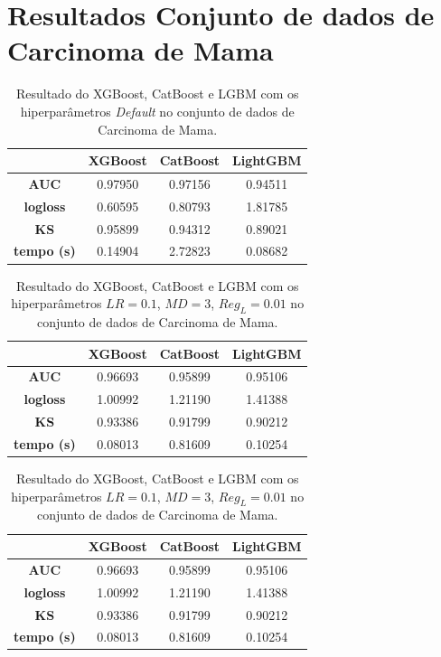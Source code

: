 \section{Resultados Conjunto de dados de Carcinoma de Mama}
\begin{table}[H]
\centering
\begin{tabular}{|c|c|c|c|}
\hline
	& \textbf{XGBoost} &\textbf{CatBoost} & \textbf{LightGBM} \\
\hline
\textbf{AUC}	& 0.97950	&0.97156	&0.94511 \\
\hline
\textbf{logloss}	&0.60595	&0.80793&	1.81785 \\
\hline
\textbf{KS}	&0.95899	&0.94312	&0.89021 \\
\hline
\textbf{tempo (s)}	&0.14904	&2.72823	&0.08682 \\
\hline
\end{tabular}
\caption{Resultado do XGBoost, CatBoost e LGBM com os hiperparâmetros \textit{Default} no conjunto de dados de Carcinoma de Mama.}\label{res:can:1}
\end{table}

\begin{table}[H]
\label{res:ren:2}
\centering
\begin{tabular}{|c|c|c|c|}
\hline
	& \textbf{XGBoost} &\textbf{CatBoost} & \textbf{LightGBM} \\
\hline
\textbf{AUC}	& 0.96693&	0.95899 &	0.95106 \\
\hline
\textbf{logloss}	& 1.00992&	1.21190&	1.41388 \\
\hline
\textbf{KS}	&0.93386&	0.91799	&0.90212 \\
\hline
\textbf{tempo (s)}	&0.08013	&0.81609	&0.10254 \\
\hline
\end{tabular}
\caption{Resultado do XGBoost, CatBoost e LGBM com os hiperparâmetros $LR=0.1$, $MD=3$, $Reg_L=0.01$ no conjunto de dados de Carcinoma de Mama.}
\end{table}

\begin{table}[H]
\label{res:ren:2}
\centering
\begin{tabular}{|c|c|c|c|}
\hline
	& \textbf{XGBoost} &\textbf{CatBoost} & \textbf{LightGBM} \\
\hline
\textbf{AUC}	& 0.96693&	0.95899 &	0.95106 \\
\hline
\textbf{logloss}	& 1.00992&	1.21190&	1.41388 \\
\hline
\textbf{KS}	&0.93386&	0.91799	&0.90212 \\
\hline
\textbf{tempo (s)}	&0.08013	&0.81609	&0.10254 \\
\hline
\end{tabular}
\caption{Resultado do XGBoost, CatBoost e LGBM com os hiperparâmetros $LR=0.1$, $MD=3$, $Reg_L=0.01$ no conjunto de dados de Carcinoma de Mama.}
\end{table}

